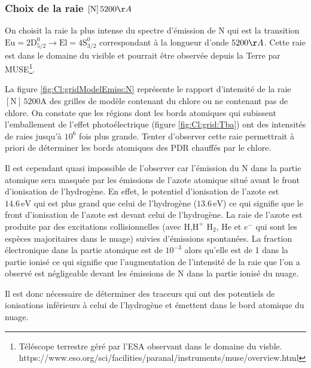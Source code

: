 \subsubsection{Choix de la raie $[\mathrm{N}]\,5200 \AA$}

On choisit la raie la plus intense du spectre d'émission de $\mathrm{N}$ qui est la transition $\mathrm{Eu}=2\mathrm{D}^\mathrm{0}_{5/2} \rightarrow \mathrm{El}=4\mathrm{S}^\mathrm{0}_{3/2}$ correspondant à la longueur d'onde $5200 \AA$. Cette raie est dans le domaine du visible et pourrait être observée depuis la Terre par MUSE\footnote{
Téléscope terrestre géré par l'ESA observant dans le domaine du visble. \\
https://www.eso.org/sci/facilities/paranal/instruments/muse/overview.html}. \newline 

La figure \ref{fig:Cl:gridModelEmiss:N} représente le rapport d'intensité de la raie $[\mathrm{N}]\,5200 \mathrm{A}$ des grilles de modèle contenant du chlore ou ne contenant pas de chlore. On constate que les régions dont les bords atomiques qui subissent l'emballement de l'effet photoélectrique (figure \ref{fig:Cl:grid:Tba}) ont des intensités de raies jusqu'à $10^6$ fois plus grande. Tenter d'observer cette raie permettrait à priori de déterminer les bords atomiques des PDR chauffés par le chlore. \newline 

Il est cependant quasi impossible de l'observer car l'émission du $\mathrm{N}$ dans la partie atomique sera masquée par les émissions de l'azote atomique situé avant le front d'ionisation de l'hydrogène. En effet, le potentiel d'ionisation de l'azote est $14.6\,\mathrm{eV}$ qui est plus grand que celui de l'hydrogène ($13.6\,\mathrm{eV}$) ce qui signifie que le front d'ionisation de l'azote est devant celui de l'hydrogène. La raie de l'azote est produite par des excitations collisionnelles (avec $\mathrm{H}$,$\mathrm{H}^+$ $\mathrm{H}_2$, $\mathrm{He}$ et $e^-$ qui sont les espèces majoritaires dans le nuage) suivies d'émissions spontanées. La fraction électronique dans la partie atomique est de $10^{-3}$ alors qu'elle est de 1 dans la partie ionisé ce qui signifie que l'augmentation de l'intensité de la raie que l'on a observé est négligeable devant les émissions de $\mathrm{N}$ dans la partie ionisé du nuage.\newline

Il est donc nécessaire de déterminer des traceurs qui ont des potentiels de ionisations inférieurs à celui de l'hydrogène et émettent dans le bord atomique du nuage. 

